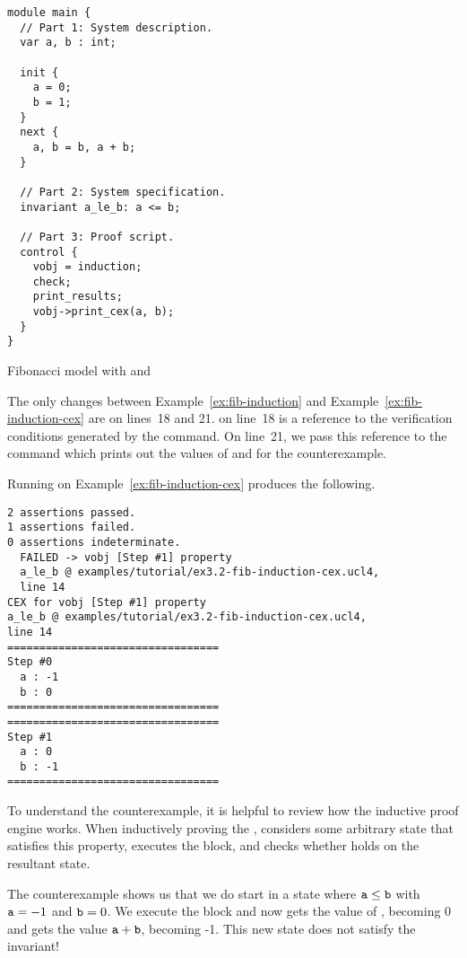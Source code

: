 \begin{uclidlisting}[htbp]
\begin{lstlisting}[language=uclid,style=uclidstyle]
module main {
  // Part 1: System description.
  var a, b : int;

  init {
    a = 0;
    b = 1;
  }
  next {
    a, b = b, a + b;
  }

  // Part 2: System specification.
  invariant a_le_b: a <= b;

  // Part 3: Proof script.
  control {
    vobj = induction;
    check;
    print_results;
    vobj->print_cex(a, b);
  }
}
\end{lstlisting}
\caption{\uclid{} Fibonacci model with  and }
\label{ex:fib-induction-cex}
\end{uclidlisting}

The only changes between Example~\ref{ex:fib-induction} and Example~\ref{ex:fib-induction-cex} are on lines~18 and 21.  on line~18 is a reference to the verification conditions generated by the  command. On line~21, we pass this reference to the  command which prints out the values of  and  for the counterexample.

Running \uclid{} on Example~\ref{ex:fib-induction-cex} produces the following.

\begin{Verbatim}[frame=single, samepage=true]
2 assertions passed.
1 assertions failed.
0 assertions indeterminate.
  FAILED -> vobj [Step #1] property 
  a_le_b @ examples/tutorial/ex3.2-fib-induction-cex.ucl4, 
  line 14
CEX for vobj [Step #1] property 
a_le_b @ examples/tutorial/ex3.2-fib-induction-cex.ucl4, 
line 14
=================================
Step #0
  a : -1
  b : 0
=================================
=================================
Step #1
  a : 0
  b : -1
=================================
\end{Verbatim}

To understand the counterexample, it is helpful to review how the inductive proof engine works. When inductively proving the  , \uclid{} considers some arbitrary state that satisfies this property, executes the  block, and checks whether  holds on the resultant state.

The counterexample shows us that we do start in a state where $\texttt{a} \le \texttt{b}$ with $\texttt{a}=-1$ and $\texttt{b}=0$. We execute the  block and now  gets the value of , becoming 0 and  gets the value $\texttt{a} + \texttt{b}$, becoming -1. This new state does not satisfy the invariant!

